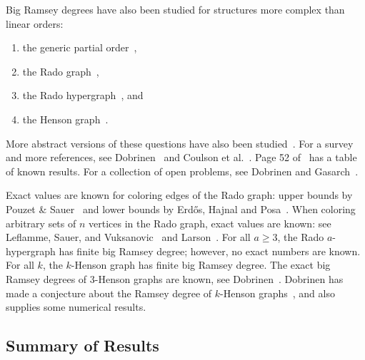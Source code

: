 \documentclass[11pt]{article}
\theoremstyle{plain}
\theoremstyle{definition}
\begin{document}
Big Ramsey degrees have also been studied for structures more complex than
linear orders:
\begin{enumerate} 
\item 
the generic partial order~\cite{BCDHKVZ-2023,Hubicka-2020},
\item 
the Rado graph~\cite{EHP-1975,LSV-2006,Larson-2008,PS-1996,Sauer-2006},
\item 
the Rado 
hypergraph~\cite{BCHKV-2020,BCRHKK-2023,CDP-2022-ind,CDP-2022-simply}, and
\item 
the Henson graph~\cite{Dobrinen-2020-I,Dobrinen-2020-II,Dobrinen-2023}.
\end{enumerate} 

More abstract versions of these questions have also been 
studied~\cite{Masulovic-2020,The-2009,Zucker-2022}.
For a survey and more references, see Dobrinen~\cite{Dobrinen-2022} and 
Coulson et al.~\cite{CDP-2022-ind,CDP-2022-simply}.
Page 52 of~\cite{CDP-2022-simply} has a table of known results.
For a collection of open problems, see
Dobrinen and Gasarch~\cite{dobrinen-open-2020}.


Exact values are known for
coloring edges of the Rado graph:
upper bounds by
Pouzet \& Sauer~\cite{PS-1996} and
lower bounds by 
Erd\H{o}s, Hajnal and Posa~\cite{EHP-1975}. 
When coloring arbitrary sets of $n$ vertices in
the Rado graph,
exact values are known: see Leflamme, Sauer, and
Vuksanovic~\cite{LSV-2006} and Larson~\cite{Larson-2008}.
For all $a\ge 3$, the Rado $a$-hypergraph has finite big Ramsey degree;
however, no exact numbers are known. 
For all $k$, the $k$-Henson graph has finite big Ramsey degree. The exact big Ramsey degrees of 3-Henson graphs are known, see Dobrinen~\cite[Corollary 5.13]{Dobrinen-2020-II}. Dobrinen has made a conjecture about the Ramsey degree of $k$-Henson graphs~\cite[Section 11: Future Directions]{Dobrinen-2023},
and also supplies some numerical results. 

\subsection{Summary of Results}

\end{document}
